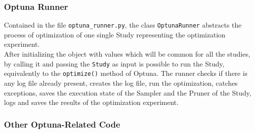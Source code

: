 \subsubsection{Optuna Runner}

Contained in the file \texttt{optuna\_runner.py}, the class \texttt{OptunaRunner} abstracts the process of optimization of one single Study representing the optimization experiment.
% 
\\[0.3cm]After initializing the object with values which will be common for all the studies, by calling it and passing the \texttt{Study} as input is possible to run the Study, equivalently to the \texttt{optimize()} method of Optuna.
The runner checks if there is any log file already present, creates the log file, run the optimization, catches exceptions, saves the execution state of the Sampler and the Pruner of the Study, logs and saves the results of the optimization experiment.

\subsubsection{Other Optuna-Related Code}

